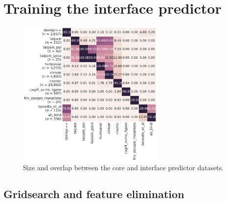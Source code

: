 \section{Training the interface predictor}

\begin{figure}[ht]
	\centering
	\includegraphics[width=0.65\textwidth]{static/elaspic_training_set/data_statistics/training_set_overlap_data_df_interface.pdf}
	\caption{Size and overlap between the core and interface predictor datasets.}
\end{figure}


\subsection{Gridsearch and feature elimination}

